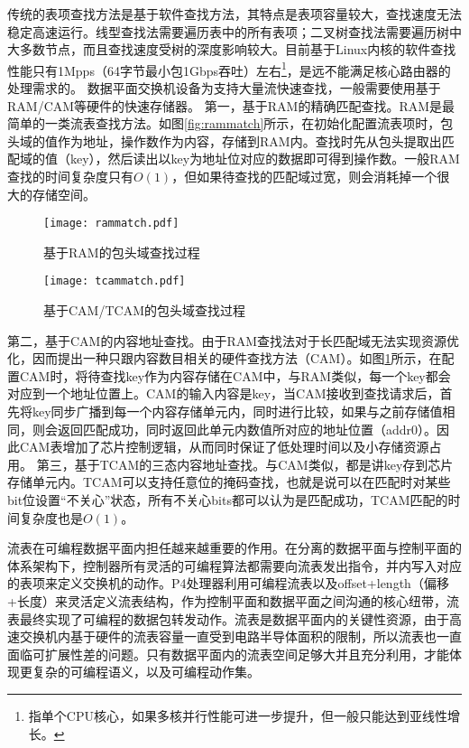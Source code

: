 传统的表项查找方法是基于软件查找方法，其特点是表项容量较大，查找速度无法稳定高速运行。线型查找法需要遍历表中的所有表项；二叉树查找法需要遍历树中大多数节点，而且查找速度受树的深度影响较大。目前基于Linux内核的软件查找性能只有1Mpps（64字节最小包1Gbps吞吐）左右\footnote{指单个CPU核心，如果多核并行性能可进一步提升，但一般只能达到亚线性增长。}，是远不能满足核心路由器的处理需求的。
数据平面交换机设备为支持大量流快速查找，一般需要使用基于RAM/CAM等硬件的快速存储器。
第一，基于RAM的精确匹配查找。RAM是最简单的一类流表查找方法。如图\ref{fig:rammatch}所示，在初始化配置流表项时，包头域的值作为地址，操作数作为内容，存储到RAM内。查找时先从包头提取出匹配域的值（key），然后读出以key为地址位对应的数据即可得到操作数。一般RAM查找的时间复杂度只有$O(1)$，但如果待查找的匹配域过宽，则会消耗掉一个很大的存储空间。
\begin{figure}[htbp]
	\centering 
	\vspace{-1.5mm}
	\begin{minipage}[t]{0.39\textwidth}
		\centering
		\texttt{[image: rammatch.pdf]}
		\caption{基于RAM的包头域查找过程} \label{fig:rammatch}
	\end{minipage}
	\begin{minipage}[t]{0.6\textwidth}
		\centering
		\texttt{[image: tcammatch.pdf]}%
		\caption{基于CAM/TCAM的包头域查找过程} \label{fig:tcammatch}
	\end{minipage}
\end{figure}
第二，基于CAM的内容地址查找。由于RAM查找法对于长匹配域无法实现资源优化，因而提出一种只跟内容数目相关的硬件查找方法（CAM）。如图\ref{fig:tcammatch}所示，在配置CAM时，将待查找key作为内容存储在CAM中，与RAM类似，每一个key都会对应到一个地址位置上。CAM的输入内容是key，当CAM接收到查找请求后，首先将key同步广播到每一个内容存储单元内，同时进行比较，如果与之前存储值相同，则会返回匹配成功，同时返回此单元内数值所对应的地址位置（addr0）。因此CAM表增加了芯片控制逻辑，从而同时保证了低处理时间以及小存储资源占用。
第三，基于TCAM的三态内容地址查找。与CAM类似，都是讲key存到芯片存储单元内。TCAM可以支持任意位的掩码查找，也就是说可以在匹配时对某些bit位设置“不关心”状态，所有不关心bits都可以认为是匹配成功，TCAM匹配的时间复杂度也是$O(1)$。



流表在可编程数据平面内担任越来越重要的作用。在分离的数据平面与控制平面的体系架构下，控制器所有灵活的可编程算法都需要向流表发出指令，并内写入对应的表项来定义交换机的动作。P4处理器利用可编程流表以及offset+length（偏移+长度）来灵活定义流表结构，作为控制平面和数据平面之间沟通的核心纽带，流表最终实现了可编程的数据包转发动作。流表是数据平面内的关键性资源，由于高速交换机内基于硬件的流表容量一直受到电路半导体面积的限制，所以流表也一直面临可扩展性差的问题。只有数据平面内的流表空间足够大并且充分利用，才能体现更复杂的可编程语义，以及可编程动作集。

